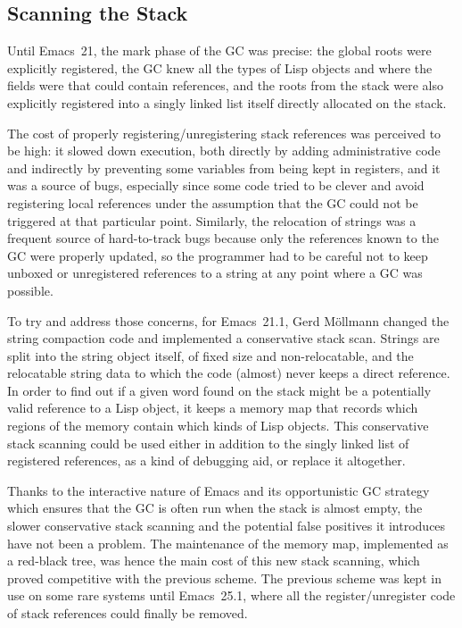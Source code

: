 \documentclass[format=acmsmall,screen]{acmart}
\begin{document}
\subsection{Scanning the Stack}
\label{sec:stack-scanning}

Until Emacs~21, the mark phase of the GC was precise: the global roots were
explicitly registered, the GC knew all the types of Lisp objects and where
the fields were that could contain references, and the roots from the stack
were also explicitly registered into a singly linked list itself directly
allocated on the stack.

The cost of properly registering/unregistering stack references was
perceived to be high: it slowed down execution, both directly by adding
administrative code and indirectly by preventing some variables from being
kept in registers, and it was a source of bugs, especially since some code
tried to be clever and avoid registering local references under the
assumption that the GC could not be triggered at that particular point.
Similarly, the relocation of strings was a frequent source of hard-to-track
bugs because only the references known to the GC were properly updated, so
the programmer had to be careful not to keep unboxed or unregistered
references to a string at any point where a GC was possible.

To try and address those concerns, for Emacs~21.1, Gerd Möllmann changed the
string compaction code and implemented a conservative stack scan.
Strings are split into the string object itself, of fixed size and
non-relocatable, and the relocatable string data to which the code (almost)
never keeps a direct reference.  In order to find out if a given word found
on the stack might be a potentially valid reference to a Lisp object, it
keeps a memory map that records which regions of the memory contain which
kinds of Lisp objects.  This conservative stack scanning could be used
either in addition to the singly linked list of registered references, as
a kind of debugging aid, or replace it altogether.

Thanks to the interactive nature of Emacs and its opportunistic GC strategy
which ensures that the GC is often run when the stack is almost empty, the
slower conservative stack scanning and the potential false positives it
introduces have not been a problem.  The maintenance of the memory map,
implemented as a red-black tree, was hence the main cost of this new stack
scanning, which proved competitive with the previous scheme.  The previous
scheme was kept in use on some rare systems until Emacs~25.1, where all the
register/unregister code of stack references could finally be removed.
\end{document}
